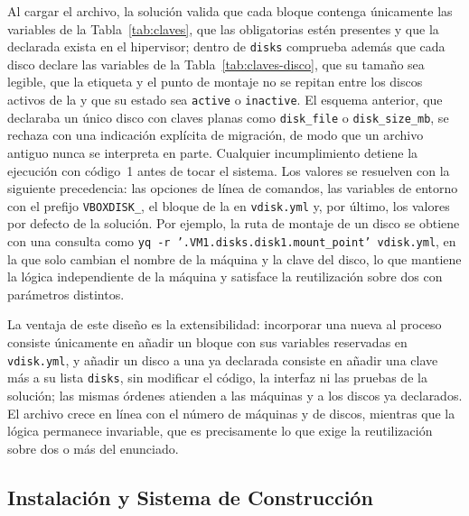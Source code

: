 Al cargar el archivo, la solución valida que cada bloque contenga únicamente las variables de la Tabla~\ref{tab:claves}, que las obligatorias estén presentes y que la \vm{} declarada exista en el hipervisor; dentro de \texttt{disks} comprueba además que cada disco declare las variables de la Tabla~\ref{tab:claves-disco}, que su tamaño sea legible, que la etiqueta y el punto de montaje no se repitan entre los discos activos de la \vm{} y que su estado sea \texttt{active} o \texttt{inactive}. El esquema anterior, que declaraba un único disco con claves planas como \texttt{disk\_file} o \texttt{disk\_size\_mb}, se rechaza con una indicación explícita de migración, de modo que un archivo antiguo nunca se interpreta en parte. Cualquier incumplimiento detiene la ejecución con código~1 antes de tocar el sistema. Los valores se resuelven con la siguiente precedencia: las opciones de línea de comandos, las variables de entorno con el prefijo \texttt{VBOXDISK\_}, el bloque de la \vm{} en \texttt{vdisk.yml} y, por último, los valores por defecto de la solución. Por ejemplo, la ruta de montaje de un disco se obtiene con una consulta como \texttt{yq -r '.VM1.disks.disk1.mount\_point' vdisk.yml}, en la que solo cambian el nombre de la máquina y la clave del disco, lo que mantiene la lógica independiente de la máquina y satisface la reutilización sobre dos \vm{} con parámetros distintos.

La ventaja de este diseño es la extensibilidad: incorporar una \vm{} nueva al proceso consiste únicamente en añadir un bloque con sus variables reservadas en \texttt{vdisk.yml}, y añadir un disco a una \vm{} ya declarada consiste en añadir una clave más a su lista \texttt{disks}, sin modificar el código, la interfaz ni las pruebas de la solución; las mismas órdenes atienden a las máquinas y a los discos ya declarados. El archivo crece en línea con el número de máquinas y de discos, mientras que la lógica permanece invariable, que es precisamente lo que exige la reutilización sobre dos o más \vm{} del enunciado.

\subsection{Instalación y Sistema de Construcción}
\label{sub:build}

